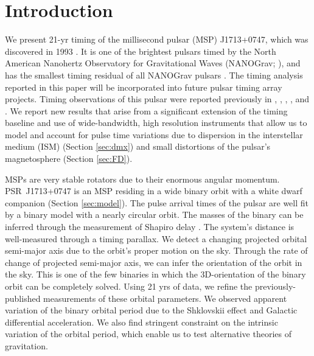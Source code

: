 \section{Introduction}
\label{sec:intro}
We present 21-yr timing of the millisecond pulsar (MSP) J1713+0747, which
was discovered in 1993 \citep{fwc93}. It is one of the brightest pulsars timed by the
North American Nanohertz Observatory for Gravitational Waves (NANOGrav;
\citealt{mcl13, dfg+13}), and has the smallest timing residual of all NANOGrav
pulsars \citep{dfg+13}.
The timing analysis reported in this paper will be incorporated into future pulsar timing array
projects.
Timing observations of this pulsar were reported previously in
\citealt{cfw94}, \citealt{lb01}, \citealt{vb03}, \citealt{sns+05}, \citealt{hbo06} and \citealt{ver09}.
We report new results that arise from a significant extension of the timing
baseline and use of wide-bandwidth, high resolution instruments that allow us
to model and account for pulse time variations due to dispersion in the interstellar medium (ISM)
(Section \ref{sec:dmx}) and small distortions of the pulsar's magnetosphere (Section \ref{sec:FD}). 

MSPs are very stable rotators due to their enormous
angular momentum. PSR~J1713+0747 is an MSP residing in a wide binary orbit with a white dwarf companion (Section \ref{sec:model}). 
The pulse arrival times of the pulsar are well fit by a binary model with
a nearly circular orbit. The masses of
the binary can be inferred through the measurement of Shapiro delay \citep{sns+05}. 
The system's distance is well-measured through a timing parallax. We detect
a changing projected orbital semi-major axis due to the orbit's proper motion
on the sky. Through the rate of change of projected semi-major axis, we can infer 
the orientation of the orbit in the sky.
This is one of the few binaries in which the 3D-orientation of the
binary orbit can be completely solved. Using 21 yrs of data, we
refine the previously-published measurements of these orbital parameters.
We observed apparent variation of the binary orbital period due to the Shklovskii effect 
and Galactic differential acceleration.
We also find stringent constraint on the intrinsic variation of the orbital
period, which enable us to test alternative theories of gravitation.

